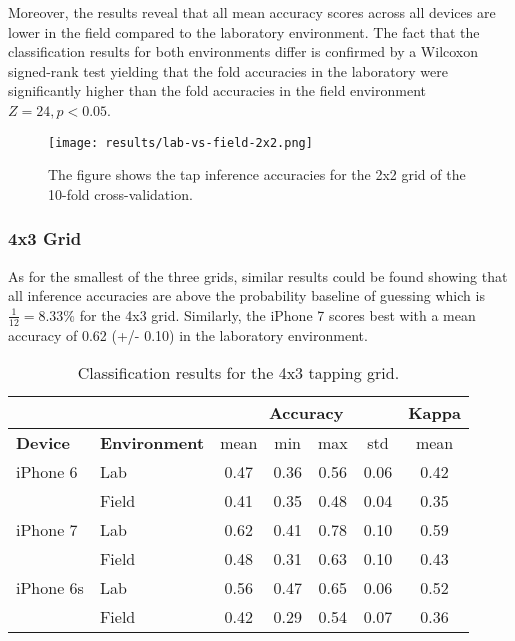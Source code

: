 Moreover, the results reveal that all mean accuracy scores across all devices are lower in the field compared to the laboratory environment. The fact that the classification results for both environments differ is confirmed by a Wilcoxon signed-rank test yielding that the fold accuracies in the laboratory were significantly higher than the fold accuracies in the field environment $Z = 24, p < 0.05$.

\begin{figure}[h!]
  \centering
  \texttt{[image: results/lab-vs-field-2x2.png]}
  \caption{The figure shows the tap inference accuracies for the 2x2 grid of the 10-fold cross-validation.} \label{fig:participation}
\end{figure}

\subsubsection{4x3 Grid}

As for the smallest of the three grids, similar results could be found showing that all inference accuracies are above the probability baseline of guessing which is $\frac{1}{12}= 8.33\%$ for the 4x3 grid. Similarly, the iPhone 7 scores best with a mean accuracy of 0.62 (+/- 0.10) in the laboratory environment.

\begin{table}[h!]
  \centering
\begin{tabular}{|l|l|c|c|c|c|c|}
  \cline{3-7}
  \multicolumn{2}{c}{} & \multicolumn{4}{|c|}{\textbf{Accuracy}} & \textbf{Kappa} \\
  \hline
  \textbf{Device} & \textbf{Environment} & mean &   min &   max  & std &  mean \\
  \hline
  iPhone 6 & Lab &      0.47 &     0.36 &     0.56 &     0.06 &        0.42 \\
  & Field &      0.41 &     0.35 &     0.48 &     0.04 &        0.35 \\
  \hline
iPhone 7 & Lab &      0.62 &     0.41 &     0.78 &     0.10 &        0.59 \\
  & Field &      0.48 &     0.31 &     0.63 &     0.10 &        0.43 \\
  \hline
iPhone 6s & Lab &      0.56 &     0.47 &     0.65 &     0.06 &        0.52 \\
  & Field &      0.42 &     0.29 &     0.54 &     0.07 &        0.36 \\
  \hline
\end{tabular}
  \caption{Classification results for the 4x3 tapping grid.}
\end{table}

